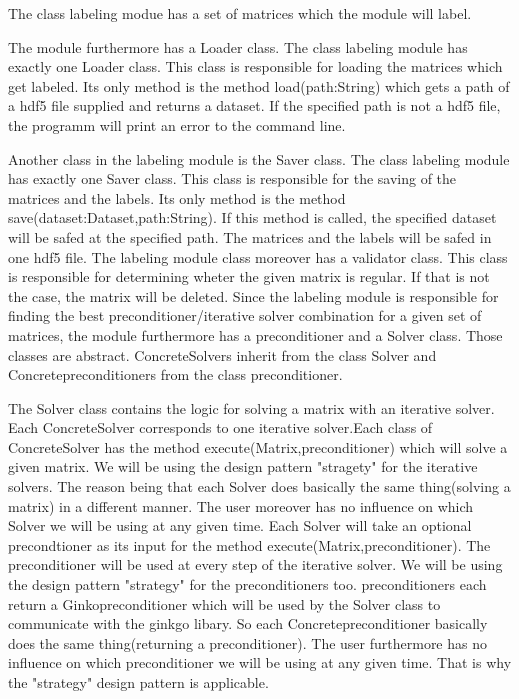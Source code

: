 \documentclass[parskip=full]{scrartcl}
\begin{document}
The class labeling modue has a set of matrices which the module will label.\newline\newline

The module furthermore has a Loader class. The class labeling module has exactly one Loader class. This class is responsible for loading the matrices which get labeled. Its only method is the method load(path:String) which gets a path of a hdf5 file supplied and returns a dataset. If the specified path is not a hdf5 file, the programm will print an error to the command line. \newline\newline

Another class in the labeling module is the Saver class. The class labeling module has exactly one Saver class. This class is responsible for the saving of the matrices and the \glspl{label}. Its only method is the method save(dataset:Dataset,path:String). If this method is called, the specified dataset will be safed at the specified path. The matrices and the \glspl{label} will be safed in one hdf5 file.\newline
\newline
The labeling module class moreover has a validator class. This class is responsible for determining wheter the given matrix is regular. If that is not the case, the matrix will be deleted.
\newline\newline
Since the labeling module is responsible for finding the best \gls{preconditioner}/\gls{iterative solver} combination for a given set of matrices, the module furthermore has a \gls{preconditioner} and a Solver class. Those classes are abstract. ConcreteSolvers inherit from the class Solver and Concrete\gls{preconditioner}s from the class \gls{preconditioner}.\newline\newline

The Solver class contains the logic for solving a matrix with an \gls{iterative solver}. Each ConcreteSolver corresponds to one \gls{iterative solver}.Each class of ConcreteSolver has the method execute(Matrix,\gls{preconditioner}) which will solve a given matrix. We will be using the design pattern "stragety" for the \gls{iterative solver}s. The reason being that each Solver does basically the same thing(solving a matrix) in a different manner. The user moreover has no influence on which Solver we will be using at any given time.
Each Solver will take an optional precondtioner as its input for the method execute(Matrix,\gls{preconditioner}). The \gls{preconditioner} will be used at every step of the \gls{iterative solver}. We will be using the design pattern "\gls{strategy}" for the \gls{preconditioner}s too. \gls{preconditioner}s each return a Ginko\gls{preconditioner} which will be used by the Solver class to communicate with the ginkgo libary. So each Concrete\gls{preconditioner} basically does the same thing(returning a \gls{preconditioner}). The user furthermore has no influence on which \gls{preconditioner} we will be using at any given time. That is why the "\gls{strategy}" design pattern is applicable.
\end{document}
